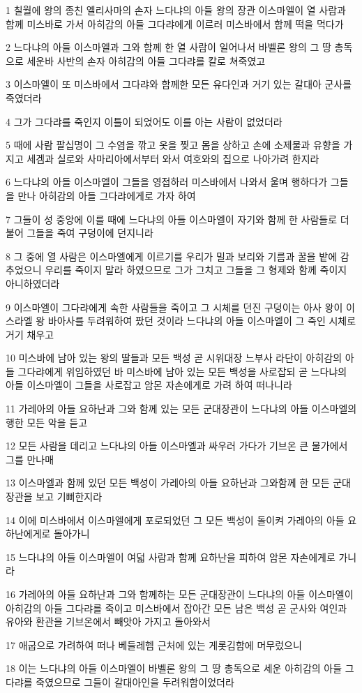\par 1 칠월에 왕의 종친 엘리사마의 손자 느다냐의 아들 왕의 장관 이스마엘이 열 사람과 함께 미스바로 가서 아히감의 아들 그다랴에게 이르러 미스바에서 함께 떡을 먹다가
\par 2 느다냐의 아들 이스마엘과 그와 함께 한 열 사람이 일어나서 바벨론 왕의 그 땅 총독으로 세운바 사반의 손자 아히감의 아들 그다랴를 칼로 쳐죽였고
\par 3 이스마엘이 또 미스바에서 그다랴와 함께한 모든 유다인과 거기 있는 갈대아 군사를 죽였더라
\par 4 그가 그다랴를 죽인지 이틀이 되었어도 이를 아는 사람이 없었더라
\par 5 때에 사람 팔십명이 그 수염을 깎고 옷을 찢고 몸을 상하고 손에 소제물과 유향을 가지고 세겜과 실로와 사마리아에서부터 와서 여호와의 집으로 나아가려 한지라
\par 6 느다냐의 아들 이스마엘이 그들을 영접하러 미스바에서 나와서 울며 행하다가 그들을 만나 아히감의 아들 그다랴에게로 가자 하여
\par 7 그들이 성 중앙에 이를 때에 느다냐의 아들 이스마엘이 자기와 함께 한 사람들로 더불어 그들을 죽여 구덩이에 던지니라
\par 8 그 중에 열 사람은 이스마엘에게 이르기를 우리가 밀과 보리와 기름과 꿀을 밭에 감추었으니 우리를 죽이지 말라 하였으므로 그가 그치고 그들을 그 형제와 함께 죽이지 아니하였더라
\par 9 이스마엘이 그다랴에게 속한 사람들을 죽이고 그 시체를 던진 구덩이는 아사 왕이 이스라엘 왕 바아사를 두려워하여 팠던 것이라 느다냐의 아들 이스마엘이 그 죽인 시체로 거기 채우고
\par 10 미스바에 남아 있는 왕의 딸들과 모든 백성 곧 시위대장 느부사 라단이 아히감의 아들 그다랴에게 위임하였던 바 미스바에 남아 있는 모든 백성을 사로잡되 곧 느다냐의 아들 이스마엘이 그들을 사로잡고 암몬 자손에게로 가려 하여 떠나니라
\par 11 가레아의 아들 요하난과 그와 함께 있는 모든 군대장관이 느다냐의 아들 이스마엘의 행한 모든 악을 듣고
\par 12 모든 사람을 데리고 느다냐의 아들 이스마엘과 싸우러 가다가 기브온 큰 물가에서 그를 만나매
\par 13 이스마엘과 함께 있던 모든 백성이 가레아의 아들 요하난과 그와함께 한 모든 군대장관을 보고 기뻐한지라
\par 14 이에 미스바에서 이스마엘에게 포로되었던 그 모든 백성이 돌이켜 가레아의 아들 요하난에게로 돌아가니
\par 15 느다냐의 아들 이스마엘이 여덟 사람과 함께 요하난을 피하여 암몬 자손에게로 가니라
\par 16 가레아의 아들 요하난과 그와 함께하는 모든 군대장관이 느다냐의 아들 이스마엘이 아히감의 아들 그다랴를 죽이고 미스바에서 잡아간 모든 남은 백성 곧 군사와 여인과 유아와 환관을 기브온에서 빼앗아 가지고 돌아와서
\par 17 애굽으로 가려하여 떠나 베들레헴 근처에 있는 게롯김함에 머무렀으니
\par 18 이는 느다냐의 아들 이스마엘이 바벨론 왕의 그 땅 총독으로 세운 아히감의 아들 그다랴를 죽였으므로 그들이 갈대아인을 두려워함이었더라

